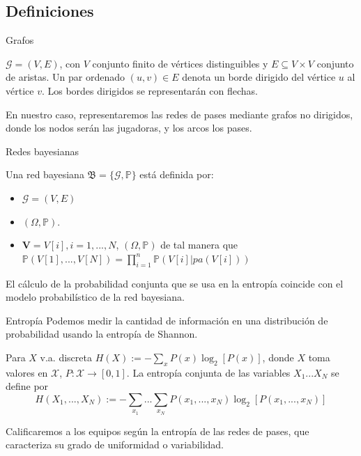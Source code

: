 \documentclass{beamer}
\begin{document}
\subsection{Definiciones}
\begin{frame}{Grafos}
	\begin{definition}
		$\mathcal{G} = (V, E)$, con $V$ conjunto finito de vértices distinguibles y 
		$E \subseteq V \times V$ conjunto de aristas. Un par ordenado $(u, v) \in E$ denota un borde dirigido
		del vértice $u$ al vértice $v$. Los bordes dirigidos se representarán con flechas. 
	\end{definition}
	En nuestro caso, representaremos las redes de pases mediante grafos no dirigidos, donde los nodos serán las 
	jugadoras, y los arcos los pases.
\end{frame}

\begin{frame}{Redes bayesianas}
    \begin{definition} 
        Una red bayesiana $\mathfrak{B} = \lbrace \mathcal{G}, \mathbb{P} \rbrace$ está definida por:
        \begin{itemize}
            \item $\mathcal{G}=(V,E)$ 
            \item $(\Omega, \mathbb{P})$.
            \item $\textbf{V}=V[i], i=1,...,N$, $(\Omega, \mathbb{P})$ 
            de tal manera que $\mathbb{P}(V[1],...,V[N])= \prod_{i=1}^{n}\mathbb{P}(V[i]|pa(V[i]))$
        \end{itemize}
    \end{definition}  
	El cálculo de la probabilidad conjunta que se usa en la entropía coincide con el modelo 
	probabilístico de la red bayesiana.
\end{frame}

\begin{frame}{Entropía}
	Podemos medir la cantidad de información en una distribución de probabilidad usando la 
	entropía de Shannon.
	\begin{definition}[Entropía] \label{def:entropy}
        Para $X$ v.a. discreta $H(X):= - \sum_{x} P(x)\log_{2}[P(x)]$, donde 
		$X$ toma valores en $\mathcal{X}$, $P:\mathcal{X} \rightarrow [0,1]$.
        La entropía conjunta de las variables $X_1...X_N$ se define por 
        $$H(X_1,...,X_N):=-\sum_{x_1}...\sum_{x_N}P(x_1,...,x_N)\log_{2}[P(x_1,...,x_N)]$$
    \end{definition}
	Calificaremos a los equipos según la entropía de las redes de pases, que caracteriza 
	su grado de uniformidad o variabilidad.
\end{frame}
\end{document}
